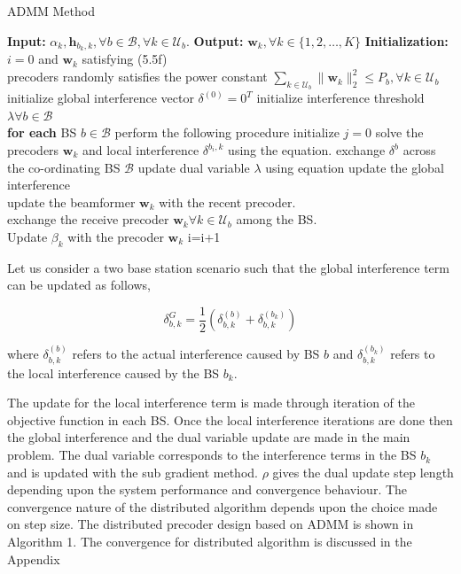 \documentclass[a4paper, 12pt,titlepage]{dithesis} %
\newcommand{\me}[1]{\( #1 \)}
\begin{document}
\begin{algorithm}[h]
	\caption[Distributed Precoder Design]{ADMM Method}
	\label{algo-1}
	\begin{algorithmic}
		\label{algo--1}
		\STATE \textbf{Input:} \me{\alpha_k, \mathbf{h}_{b_k,k}, \forall b \in \mathcal{B}, \forall k \in \mathcal{U}_b}.
		\STATE \textbf{Output:} \me{\mathbf{w}_k, \forall k \in \lbrace{1,2,\dotsc,K \rbrace}}
		\STATE \textbf{Initialization:} \me{i = 0} and \me{\mathbf{w}_k} satisfying (5.5f)\\
		precoders randomly satisfies the power constant \me{\sum_{k \in \mathcal{U}_b} \| \mathbf{w}_k \|_2^2 \leq {P_b}, \forall {k \in \mathcal{U}_{b}}}
		\STATE initialize global interference vector \me{\delta^{(0)} = 0^T}
		\STATE initialize interference threshold \me{\lambda \forall b \in \mathcal{B}}\\
		\STATE \textbf{for each} \ac{BS} \me{b \in \mathcal{B}} perform the following procedure
		\REPEAT 
		\STATE initialize \me{j = 0} 
		\REPEAT	
		\STATE solve the precoders \me{\mathbf{w}_k} and local interference \me{\delta^{{b_i},k}} using the equation.
		\STATE exchange \me{\delta^{b}} across the co-ordinating \ac{BS} \me{\mathcal{B}}
		\STATE update dual variable \me{\lambda} using equation
		\STATE update the global interference
		\UNTIL {convergence \me{j \geq J_{max}}}\\
		\STATE update the beamformer \me{\mathbf{w}_k} with the recent precoder.\\ 
		\STATE exchange the receive precoder \me{\mathbf{w}_k \forall k \in \mathcal{U}_b} among the \ac{BS}.\\
		Update \me{\beta_k} with the precoder \me{\mathbf{w}_k}
		i=i+1
		\UNTIL {convergence \me{i \geq I_{max}}}
	\end{algorithmic} 
\end{algorithm}

Let us consider a two base station scenario such that the global interference term can be updated as follows,

\begin{equation}
\delta ^ {G}_{b,k} ={ \frac 1 {2}}{(\delta^{(b)}_{b,k}+\delta^{(b_k)}_{b,k})}
\label{deltaupdate_eqn}
\end{equation}

where \me{\delta^{(b)}_{b,k}} refers to the actual interference caused by BS \me{b} and \me{\delta^{(b_k)}_{b,k}} refers to the local interference caused by the BS \me{b_k}.

The update for the local interference term is made through iteration of the objective function in each BS. Once the local interference iterations are done then the global interference and the dual variable update are made in the main problem. The dual variable corresponds to the interference terms in the BS \me{b_k} and is updated with the sub gradient method. \me{\rho} gives the dual update step length depending upon the system performance and convergence behaviour. The convergence nature  of the distributed algorithm depends upon the choice made on step size. The distributed precoder design based on \ac{ADMM} is shown in Algorithm 1. The convergence for distributed algorithm is discussed in the Appendix
\end{document}

